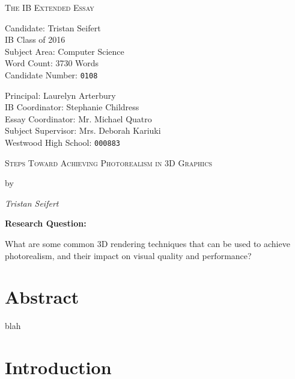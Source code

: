 \documentclass[11pt, oneside]{report}
\begin{document}
\begin{titlepage}
	{\centering\scshape\Huge The IB Extended Essay\par}
	
	\begin{minipage}[t]{0.48\textwidth}
		Candidate: Tristan Seifert \\
		IB Class of 2016 \\
		Subject Area: Computer Science \\
		Word Count: 3730 Words \\
		Candidate Number: \tt{0108}
	\end{minipage}
	\hfill
	\begin{minipage}[t]{0.48\textwidth}
		\begin{flushright}
			Principal: Laurelyn Arterbury \\
			IB Coordinator: Stephanie Childress \\
			Essay Coordinator: Mr. Michael Quatro \\
			Subject Supervisor: Mrs. Deborah Kariuki \\
			Westwood High School: \tt{000883}
		\end{flushright}
	\end{minipage}

	\centering
	\vspace{2.74cm}
	{\scshape\Large Steps Toward Achieving Photorealism in 3D Graphics\par}
	{by\par}
	{\itshape Tristan Seifert\par}
	\vspace{7.4cm}
	{\bfseries Research Question:}
	{What are some common 3D rendering techniques that can be used to achieve photorealism, and their impact on visual quality and performance?\par}
	\vspace{0.33cm}
	\vfill
\end{titlepage}

{
	\renewcommand{\addtocontents}[2]{}
	\chapter*{Abstract}
}
blah

\tableofcontents

\chapter{Introduction}
\end{document}
